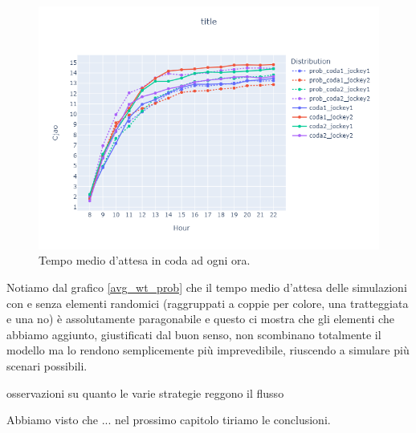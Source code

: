 \begin{figure}[htp!]
	\centering
	\includegraphics[width=12cm]{"images/results/avg_wt_prob.png"}
	\caption{Tempo medio d'attesa in coda ad ogni ora.}
	\label{fig:avg_wt_prob}
\end{figure}

Notiamo dal grafico \ref{avg_wt_prob} che il tempo medio d'attesa delle simulazioni con e senza elementi randomici (raggruppati a coppie per colore, una tratteggiata e una no) è assolutamente paragonabile e questo ci mostra che gli elementi che abbiamo aggiunto, giustificati dal buon senso, non scombinano totalmente il modello ma lo rendono semplicemente più imprevedibile, riuscendo a simulare più scenari possibili.


osservazioni su quanto le varie strategie reggono il flusso


\vspace*{1\baselineskip}



Abbiamo visto che ... nel prossimo capitolo tiriamo le conclusioni.
